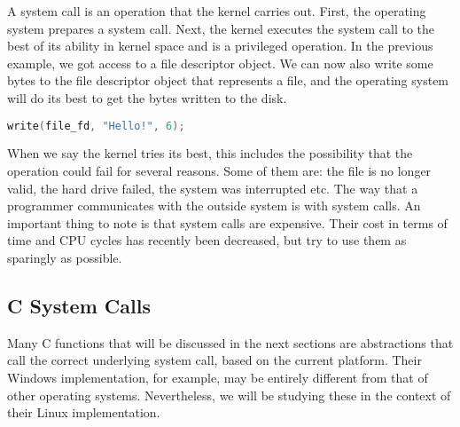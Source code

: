 A system call is an operation that the kernel carries out.
First, the operating system prepares a system call.
Next, the kernel executes the system call to the best of its ability in kernel space and is a privileged operation.
In the previous example, we got access to a file descriptor object.
We can now also write some bytes to the file descriptor object that represents a file, and the operating system will do its best to get the bytes written to the disk.

\begin{lstlisting}[language=C]
write(file_fd, "Hello!", 6);
\end{lstlisting}

When we say the kernel tries its best, this includes the possibility that the operation could fail for several reasons.
Some of them are: the file is no longer valid, the hard drive failed, the system was interrupted etc.
The way that a programmer communicates with the outside system is with system calls.
An important thing to note is that system calls are expensive.
Their cost in terms of time and CPU cycles has recently been decreased, but try to use them as sparingly as possible.

\subsection{C System Calls}

Many C functions that will be discussed in the next sections are abstractions that call the correct underlying system call, based on the current platform. 
Their Windows implementation, for example, may be entirely different from that of other operating systems.
Nevertheless, we will be studying these in the context of their Linux implementation.

